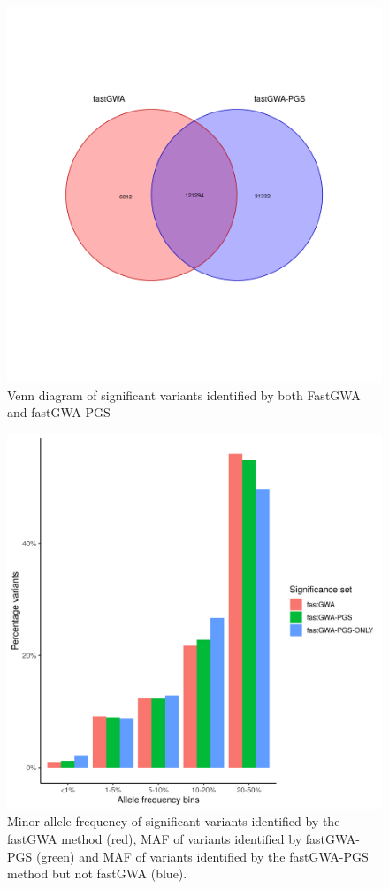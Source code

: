 \documentclass{article}
\begin{document}
\begin{figure}[h!]
  \includegraphics[width=\textwidth]{images/suppFig3.png}
  \caption{Venn diagram of significant variants identified by both FastGWA and fastGWA-PGS }
\end{figure}

\begin{figure}[h!]
  \includegraphics[width=\textwidth]{images/suppFig4.png}
  \caption{Minor allele frequency of significant variants identified by the fastGWA method (red), MAF of variants identified by fastGWA-PGS (green) and MAF of variants identified by the fastGWA-PGS method but not fastGWA (blue).}
\end{figure}
\end{document}
